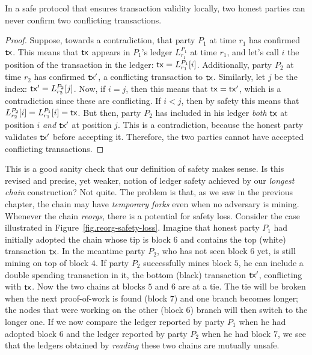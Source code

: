 \begin{lemma}
In a safe protocol that ensures transaction validity locally,
two honest parties can never confirm two conflicting transactions.
\end{lemma}
\begin{proof}
Suppose, towards a contradiction, that party $P_1$ at time $r_1$ has confirmed $\mathsf{tx}$. This means that $\mathsf{tx}$ appears in $P_1$'s
ledger $L^{P_1}_{r_1}$ at time $r_1$, and let's call $i$ the position of the transaction in the ledger: $\mathsf{tx} = L^{P_1}_{r_1}[i]$.
Additionally, party $P_2$ at time $r_2$ has confirmed $\mathsf{tx}'$, a conflicting transaction to $\mathsf{tx}$. Similarly, let $j$ be the index:
$\mathsf{tx}' = L^{P_2}_{r_2}[j]$. Now, if $i = j$, then this means that $\mathsf{tx} = \mathsf{tx}'$, which is a contradiction since these are conflicting.
If $i < j$, then by safety this means that $L^{P_2}_{r_2}[i] = L^{P_1}_{r_1}[i] = \mathsf{tx}$. But then, party $P_2$ has included
in his ledger \emph{both} $\mathsf{tx}$ at position $i$ \emph{and} $\mathsf{tx}'$ at position $j$. This is a contradiction, because the honest
party validates $\mathsf{tx}'$ before accepting it. Therefore, the two parties cannot have accepted conflicting transactions.
\end{proof}

This is a good sanity check that our definition of safety makes sense. Is this revised and precise, yet weaker, notion of ledger
safety achieved by our \emph{longest chain} construction? Not quite. The problem is that, as we saw in the previous chapter,
the chain may have \emph{temporary forks} even when no adversary is mining. Whenever the chain \emph{reorgs}, there is a
potential for safety loss. Consider the case illustrated in Figure~\ref{fig.reorg-safety-loss}. Imagine that honest party
$P_1$ had initially adopted the chain whose tip is block $6$ and contains the top (white) transaction $\mathsf{tx}$. In the meantime
party $P_2$, who has not seen block $6$ yet, is still mining on top of block $4$. If party $P_2$ successfully mines block
$5$, he can include a double spending transaction in it, the bottom (black) transaction $\mathsf{tx}'$, conflicting with $\mathsf{tx}$.
Now the two chains at blocks $5$ and $6$ are at a tie. The tie will be broken when the next proof-of-work
is found (block $7$) and one branch becomes longer; the nodes that were working on the other
(block $6$) branch will then switch to the longer one. If we now compare the ledger reported by party $P_1$ when he
had adopted block $6$ and the ledger reported by party $P_2$ when he had block $7$, we see that the
ledgers obtained by \emph{reading} these two chains are mutually unsafe.

